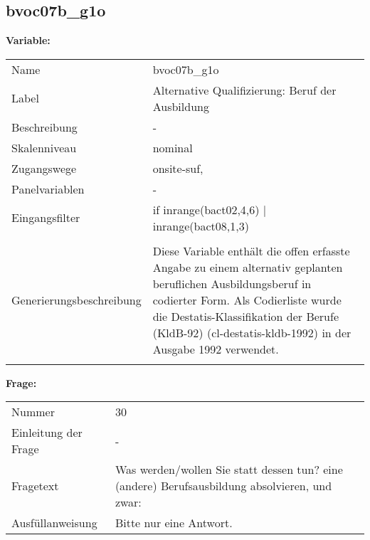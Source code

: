 	
	
	\subsection{bvoc07b\_g1o}
	\label{subSection:bvoc07b_g1o}

	\noindent\textbf{Variable:}\\
		\begin{tabular}{lL{11.3cm}}
			\label{tableVariable:bvoc07b_g1o}
			Name & bvoc07b\_g1o \\
			Label & Alternative Qualifizierung: Beruf der Ausbildung \\
			Beschreibung & - \\
			Skalenniveau & nominal \\
			Zugangswege &
				onsite-suf,
 \\
			Panelvariablen & -
			 \\
			Eingangsfilter & if inrange(bact02,4,6) | inrange(bact08,1,3) \\
 \\
					Generierungsbeschreibung & Diese Variable enthält die offen erfasste Angabe zu einem alternativ geplanten beruflichen Ausbildungsberuf in codierter Form. Als Codierliste wurde die Destatis-Klassifikation der Berufe (KldB-92) (cl-destatis-kldb-1992) in der Ausgabe 1992 verwendet. 
				 \\	
			 \\
		\end{tabular}

		\vspace*{1 cm}
		\noindent\textbf{Frage:}\\
		\begin{tabular}{lL{11.3cm}}
			\label{tableQuestion:bvoc07b_g1o}
			Nummer & 30 \\
			Einleitung der Frage & - \\
			Fragetext & Was werden/wollen Sie statt dessen tun?
eine (andere) Berufsausbildung absolvieren, und zwar: \\
			Ausfüllanweisung & Bitte nur eine Antwort. \\
		\end{tabular}





